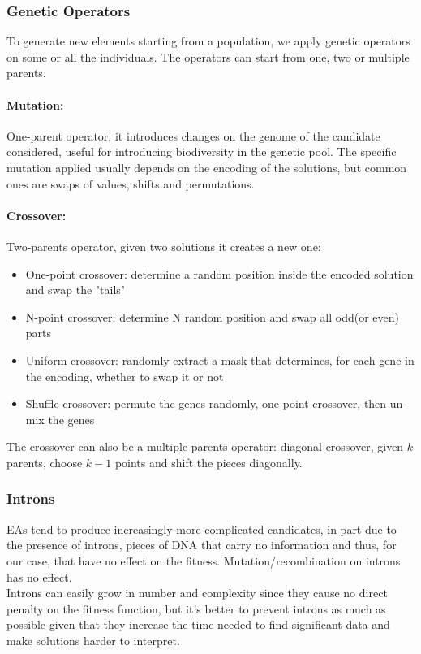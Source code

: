 \subsubsection{Genetic Operators}
To generate new elements starting from a population, we apply genetic operators on some or all the individuals. The operators can start from one, two or multiple parents.\\

\paragraph{Mutation:} One-parent operator, it introduces changes on the genome of the candidate considered, useful for introducing biodiversity in the genetic pool. The specific mutation applied usually depends on the encoding of the solutions, but common ones are swaps of values, shifts and permutations.\\

\paragraph{Crossover:} Two-parents operator, given two solutions it creates a new one: 
\begin{itemize}
	\item One-point crossover: determine a random position inside the encoded solution and swap the "tails"
	\item N-point crossover: determine N random position and swap all odd(or even) parts
	\item Uniform crossover: randomly extract a mask that determines, for each gene in the encoding, whether to swap it or not
	\item Shuffle crossover: permute the genes randomly, one-point crossover, then un-mix the genes
\end{itemize}

The crossover can also be a multiple-parents operator: diagonal crossover, given $k$ parents, choose $k-1$ points and shift the pieces diagonally.\\

\subsubsection{Introns}
EAs tend to produce increasingly more complicated candidates, in part due to the presence of introns, pieces of DNA that carry no information and thus, for our case, that have no effect on the fitness. Mutation/recombination on introns has no effect.\\
Introns can easily grow in number and complexity since they cause no direct penalty on the fitness function, but it's better to prevent introns as much as possible given that they increase the time needed to find significant data and make solutions harder to interpret.\\

